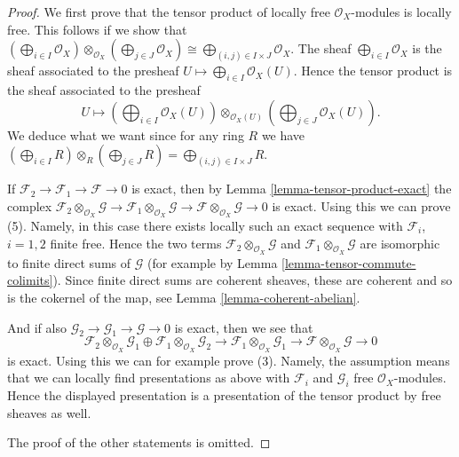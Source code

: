 \begin{proof}
We first prove that the tensor product of locally free
$\mathcal{O}_X$-modules is locally free. This follows if we show
that
$(\bigoplus_{i \in I} \mathcal{O}_X) \otimes_{\mathcal{O}_X}
(\bigoplus_{j \in J} \mathcal{O}_X) \cong
\bigoplus_{(i, j) \in I \times J} \mathcal{O}_X$.
The sheaf $\bigoplus_{i \in I} \mathcal{O}_X$ is the sheaf associated
to the presheaf $U \mapsto \bigoplus_{i \in I} \mathcal{O}_X(U)$.
Hence the tensor product is the sheaf associated
to the presheaf
$$
U \longmapsto
(\bigoplus\nolimits_{i \in I} \mathcal{O}_X(U))
\otimes_{\mathcal{O}_X(U)}
(\bigoplus\nolimits_{j \in J} \mathcal{O}_X(U)).
$$
We deduce what we want since for any ring $R$ we have
$(\bigoplus_{i \in I} R) \otimes_R (\bigoplus_{j \in J} R) =
\bigoplus_{(i, j) \in I \times J} R$.

\medskip\noindent
If $\mathcal{F}_2 \to \mathcal{F}_1 \to \mathcal{F} \to 0$
is exact, then by Lemma \ref{lemma-tensor-product-exact}
the complex
$\mathcal{F}_2 \otimes_{\mathcal{O}_X} \mathcal{G} \to
\mathcal{F}_1 \otimes_{\mathcal{O}_X} \mathcal{G} \to
\mathcal{F} \otimes_{\mathcal{O}_X} \mathcal{G} \to 0$
is exact. Using this we can prove (5). Namely, in this case there
exists locally such an exact sequence with $\mathcal{F}_i$, $i = 1, 2$
finite free. Hence the two terms
$\mathcal{F}_2 \otimes_{\mathcal{O}_X} \mathcal{G}$ and
$\mathcal{F}_1 \otimes_{\mathcal{O}_X} \mathcal{G}$
are isomorphic to finite direct sums of $\mathcal{G}$ (for example
by Lemma \ref{lemma-tensor-commute-colimits}).
Since finite direct sums are coherent sheaves, these are coherent
and so is the cokernel of the map, see Lemma \ref{lemma-coherent-abelian}.

\medskip\noindent
And if also
$\mathcal{G}_2 \to \mathcal{G}_1 \to \mathcal{G} \to 0$
is exact, then we see that
$$
\mathcal{F}_2 \otimes_{\mathcal{O}_X} \mathcal{G}_1
\oplus
\mathcal{F}_1 \otimes_{\mathcal{O}_X} \mathcal{G}_2
\to
\mathcal{F}_1 \otimes_{\mathcal{O}_X} \mathcal{G}_1
\to
\mathcal{F} \otimes_{\mathcal{O}_X} \mathcal{G}
\to 0
$$
is exact. Using this we can for example prove (3).
Namely, the assumption means that we can locally find presentations
as above with $\mathcal{F}_i$ and $\mathcal{G}_i$
free $\mathcal{O}_X$-modules. Hence the displayed presentation
is a presentation of the tensor product by free sheaves as well.

\medskip\noindent
The proof of the other statements is omitted.
\end{proof}





